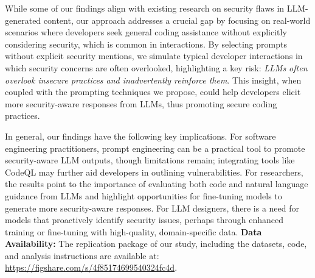 While some of our findings align with existing research on security flaws in LLM-generated content, our approach addresses a crucial gap by focusing on real-world scenarios where developers seek general coding assistance without explicitly considering security, which is common in interactions. By selecting prompts without explicit security mentions, we simulate typical developer interactions in which security concerns are often overlooked, highlighting a key risk: \textit{LLMs often overlook insecure practices and inadvertently reinforce them}. This insight, when coupled with the prompting techniques we propose, could help developers elicit more security-aware responses from LLMs, thus promoting secure coding practices. 

In general, our findings have the following key implications. For software engineering practitioners, prompt engineering can be a practical tool to promote security-aware LLM outputs, though limitations remain; integrating tools like CodeQL may further aid developers in outlining vulnerabilities. For researchers, the results point to the importance of evaluating both code and natural language guidance from LLMs and highlight opportunities for fine-tuning models to generate more security-aware responses. For LLM designers, there is a need for models that proactively identify security issues, perhaps through enhanced training or fine-tuning with high-quality, domain-specific data. 
\newline\newline
\textbf{Data Availability:} The replication package of our study, including the datasets, code, and analysis instructions are available at: \url{https://figshare.com/s/4f85174699540324fc4d}.